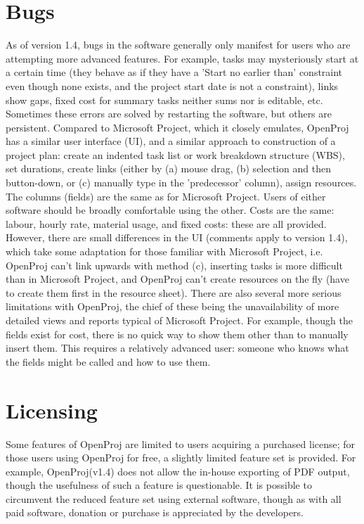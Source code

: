 \section{Bugs}
As of version 1.4, bugs in the software generally only manifest for users who are attempting
more advanced features. For example, tasks may mysteriously start at a certain time (they
behave as if they have a 'Start no earlier than' constraint even though none exists, and the project
start date is not a constraint), links show gaps, fixed cost for summary tasks neither sums nor
is editable, etc. Sometimes these errors are solved by restarting the software, but others are
persistent. Compared to Microsoft Project, which it closely emulates, OpenProj has a similar
user interface (UI), and a similar approach to construction of a project plan: create an indented
task list or work breakdown structure (WBS), set durations, create links (either by (a) mouse
drag, (b) selection and then button-down, or (c) manually type in the 'predecessor' column),
assign resources. The columns (fields) are the same as for Microsoft Project. Users of either
software should be broadly comfortable using the other. Costs are the same: labour, hourly rate,
material usage, and fixed costs: these are all provided.\\
However, there are small differences in the UI (comments apply to version 1.4), which take
some adaptation for those familiar with Microsoft Project, i.e. OpenProj can't link upwards
with method (c), inserting tasks is more difficult than in Microsoft Project, and OpenProj can't
create resources on the fly (have to create them first in the resource sheet). There are also
several more serious limitations with OpenProj, the chief of these being the unavailability of
more detailed views and reports typical of Microsoft Project. For example, though the fields
exist for cost, there is no quick way to show them other than to manually insert them. This
requires a relatively advanced user: someone who knows what the fields might be called and
how to use them.
\section{Licensing}
Some features of OpenProj are limited to users acquiring a purchased license; for those users
using OpenProj for free, a slightly limited feature set is provided. For example, OpenProj(v1.4)
does not allow the in-house exporting of PDF output, though the usefulness of such a feature
is questionable. It is possible to circumvent the reduced feature set using external software,
though as with all paid software, donation or purchase is appreciated by the developers.

